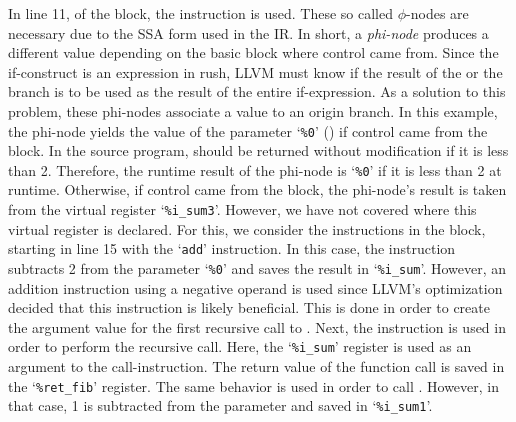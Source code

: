 In line 11, of the  block, the  instruction is used.
These so called $\phi$-nodes are necessary due to the SSA form used in the IR\@.
In short, a \emph{phi-node} produces a different value depending on the basic block where control came from.
Since the if-construct is an expression in rush, LLVM must know if the result of the  or the  branch is to be used as the result of the entire if-expression.
As a solution to this problem, these phi-nodes associate a value to an origin branch.
In this example, the phi-node yields the value of the parameter `\texttt{\%0}' () if control came from the  block.
In the source program,  should be returned without modification if it is less than 2.
Therefore, the runtime result of the phi-node is `\texttt{\%0}' if it is less than 2 at runtime.
Otherwise, if control came from the  block, the phi-node's result is taken from the virtual register `\texttt{\%i\_sum3}'.
However, we have not covered where this virtual register is declared.
For this, we consider the instructions in the  block, starting in line 15 with the `\texttt{add}' instruction.
In this case, the instruction subtracts 2 from the parameter `\texttt{\%0}' and saves the result in `\texttt{\%i\_sum}'.
However, an addition instruction using a negative operand is used since LLVM's optimization decided that this instruction is likely beneficial.
This is done in order to create the argument value for the first recursive call to .
Next, the  instruction is used in order to perform the recursive call.
Here, the `\texttt{\%i\_sum}' register is used as an argument to the call-instruction.
The return value of the function call is saved in the `\texttt{\%ret\_fib}' register.
The same behavior is used in order to call .
However, in that case, 1 is subtracted from the parameter and saved in `\texttt{\%i\_sum1}'.

